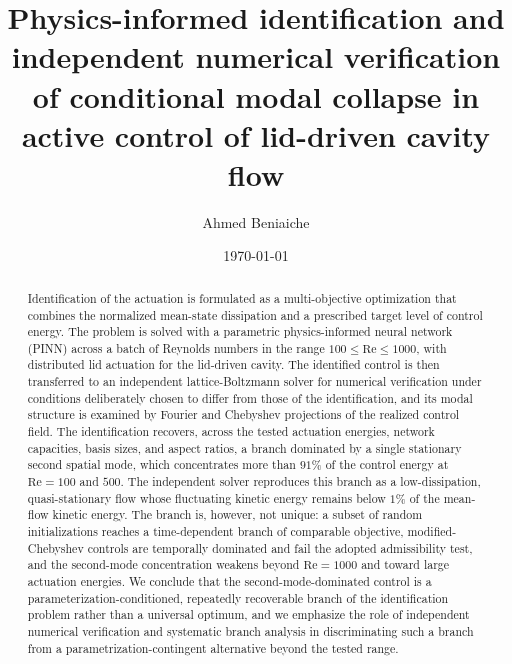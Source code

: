 \documentclass[aip,pof,reprint,superscriptaddress]{revtex4-2}
\newcommand{\re}{\mathrm{Re}}
\begin{document}
\title{Physics-informed identification and independent numerical verification of conditional modal collapse in active control of lid-driven cavity flow}

\author{Ahmed Beniaiche}

\date{\today}

\begin{abstract}
Identification of the actuation is formulated as a multi-objective optimization that combines the normalized mean-state dissipation and a prescribed target level of control energy. The problem is solved with a parametric physics-informed neural network (PINN) across a batch of Reynolds numbers in the range $100\le\re\le1000$, with distributed lid actuation for the lid-driven cavity. The identified control is then transferred to an independent lattice-Boltzmann solver for numerical verification under conditions deliberately chosen to differ from those of the identification, and its modal structure is examined by Fourier and Chebyshev projections of the realized control field. The identification recovers, across the tested actuation energies, network capacities, basis sizes, and aspect ratios, a branch dominated by a single stationary second spatial mode, which concentrates more than $91\%$ of the control energy at $\re=100$ and $500$. The independent solver reproduces this branch as a low-dissipation, quasi-stationary flow whose fluctuating kinetic energy remains below $1\%$ of the mean-flow kinetic energy. The branch is, however, not unique: a subset of random initializations reaches a time-dependent branch of comparable objective, modified-Chebyshev controls are temporally dominated and fail the adopted admissibility test, and the second-mode concentration weakens beyond $\re=1000$ and toward large actuation energies. We conclude that the second-mode-dominated control is a parameterization-conditioned, repeatedly recoverable branch of the identification problem rather than a universal optimum, and we emphasize the role of independent numerical verification and systematic branch analysis in discriminating such a branch from a parametrization-contingent alternative beyond the tested range.
\end{abstract}

\maketitle
\end{document}
